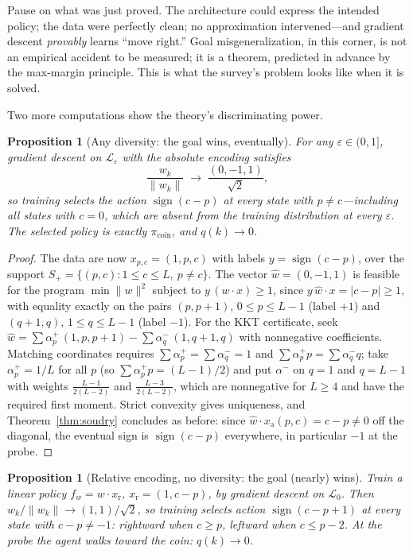 \documentclass[11pt]{amsart}
\theoremstyle{plain}
\newtheorem{proposition}[theorem]{Proposition}
\theoremstyle{definition}
\begin{document}
Pause on what was just proved. The architecture could express the intended policy; the data were perfectly clean; no approximation intervened---and gradient descent \emph{provably} learns ``move right.'' Goal misgeneralization, in this corner, is not an empirical accident to be measured; it is a theorem, predicted in advance by the max-margin principle. This is what the survey's problem looks like when it is solved.

Two more computations show the theory's discriminating power.

\begin{proposition}[Any diversity: the goal wins, eventually]\label{prop:diversity}
For any $\varepsilon\in(0,1]$, gradient descent on $\mathcal L_\varepsilon$ with the absolute encoding satisfies
\[
   \frac{w_k}{\|w_k\|}\;\longrightarrow\;\frac{(0,-1,1)}{\sqrt 2},
\]
so training selects the action $\operatorname{sign}(c-p)$ at every state with $p\ne c$---including all states with $c=0$, which are absent from the training distribution at every $\varepsilon$. The selected policy is exactly $\pi_{\mathrm{coin}}$, and $q(k)\to0$.
\end{proposition}

\begin{proof}
The data are now $x_{p,c}=(1,p,c)$ with labels $y=\operatorname{sign}(c-p)$, over the support $S_+=\{(p,c):1\le c\le L,\ p\ne c\}$. The vector $\hat w=(0,-1,1)$ is feasible for the program $\min\|w\|^2$ subject to $y\,(w\cdot x)\ge1$, since $y\,\hat w\cdot x=|c-p|\ge1$, with equality exactly on the pairs $(p,p+1)$, $0\le p\le L-1$ (label $+1$) and $(q+1,q)$, $1\le q\le L-1$ (label $-1$). For the KKT certificate, seek $\hat w=\sum\alpha^+_p\,(1,p,p+1)-\sum\alpha^-_q\,(1,q+1,q)$ with nonnegative coefficients. Matching coordinates requires $\sum\alpha^+_p=\sum\alpha^-_q=1$ and $\sum\alpha^+_pp=\sum\alpha^-_qq$; take $\alpha^+_p=1/L$ for all $p$ (so $\sum\alpha^+_pp=(L-1)/2$) and put $\alpha^-$ on $q=1$ and $q=L-1$ with weights $\frac{L-1}{2(L-2)}$ and $\frac{L-3}{2(L-2)}$, which are nonnegative for $L\ge4$ and have the required first moment. Strict convexity gives uniqueness, and Theorem~\ref{thm:soudry} concludes as before: since $\hat w\cdot x_{\mathrm a}(p,c)=c-p\neq0$ off the diagonal, the eventual sign is $\operatorname{sign}(c-p)$ everywhere, in particular $-1$ at the probe.
\end{proof}

\begin{proposition}[Relative encoding, no diversity: the goal (nearly) wins]\label{prop:relative}
Train a linear policy $f_w=w\cdot x_{\mathrm r}$, $x_{\mathrm r}=(1,c-p)$, by gradient descent on $\mathcal L_0$. Then $w_k/\|w_k\|\to(1,1)/\sqrt2$, so training selects action $\operatorname{sign}(c-p+1)$ at every state with $c-p\ne-1$: rightward when $c\ge p$, leftward when $c\le p-2$. At the probe the agent walks \emph{toward} the coin: $q(k)\to0$.
\end{proposition}
\end{document}
